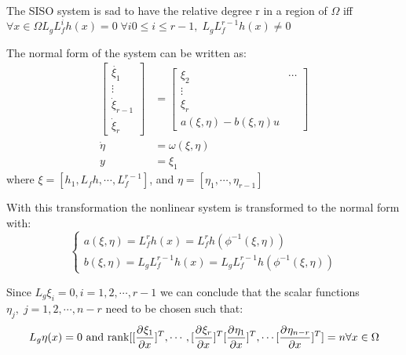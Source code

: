 {
    The SISO system is sad to have the relative degree r in a region of $\Omega$ iff  $\forall x \in \Omega L_gL_f^{i}h(x) = 0\; \forall i 0 \le i \le r-1,\; L_gL_f^{r-1}h(x) \neq 0  $ 

}
{
    The normal form of the system can be written as:
    \begin{equation}
        \begin{aligned}
            \begin{bmatrix}
                \dot{\xi_1}   \\
                \vdots\\
                \dot{\xi}_{r-1}\\
                \dot{\xi}_r
            \end{bmatrix} &= \begin{bmatrix}
                \xi_2 & \cdots  \\
                \vdots & \\
                \xi_r \\
                a(\xi,\eta) - b(\xi,\eta)u
            \end{bmatrix} \\
            \dot{\eta} &= \omega(\xi,\eta)\\
            y &= \xi_1
        \end{aligned}
    \end{equation}
    where $\xi = [h_1, L_f h,\cdots, L_f^{r-1}]$, and $\eta = [\eta_1,\cdots ,\eta_{r-1}]$
}

With this transformation the nonlinear system is transformed to the normal form with:
\begin{equation}
    \begin{cases}
a(\xi,\eta) = L_f^{r}h(x) = L_f^{r}h(\phi^{-1}(\xi,\eta))\\
b(\xi,\eta) = L_gL_f^{r-1} h(x) = L_gL_f^{r-1}h(\phi^{-1}(\xi,\eta))
    \end{cases}
\end{equation}


\mlenma{}
{
Since $L_g\xi_i = 0, i = 1,2,\cdots ,r-1$ we can conclude that the scalar functions $\eta_j,\; j=1,2,\cdots ,n-r$ need to be chosen such that:
\begin{equation}
    L_g\eta(x) = 0 \text{ and rank}[[ \frac{\partial^{}\xi_1}{\partial x^{}}]^{T},\cdots, [ \frac{\partial^{}\xi_r}{\partial x^{}}]^{T}[ \frac{\partial^{}\eta_1}{\partial x^{}}]^{T}, \cdots [ \frac{\partial^{}\eta_{n-r}}{\partial x^{}}]^{T}] = n \forall x \in \Omega 
\end{equation}

}

